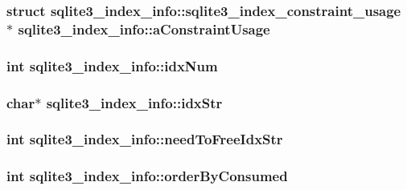 \hypertarget{structsqlite3__index__info_79b8a969dd7d582fc2ea3c0fbc5adb56}{
\subsubsection[aConstraintUsage]{\setlength{\rightskip}{0pt plus 5cm}struct {\bf sqlite3\_\-index\_\-info::sqlite3\_\-index\_\-constraint\_\-usage} $\ast$ {\bf sqlite3\_\-index\_\-info::aConstraintUsage}}}
\label{structsqlite3__index__info_79b8a969dd7d582fc2ea3c0fbc5adb56}


\hypertarget{structsqlite3__index__info_fcee17707a1c147fbd55c23c807fdae3}{
\subsubsection[idxNum]{\setlength{\rightskip}{0pt plus 5cm}int {\bf sqlite3\_\-index\_\-info::idxNum}}}
\label{structsqlite3__index__info_fcee17707a1c147fbd55c23c807fdae3}


\hypertarget{structsqlite3__index__info_1a9935e997bd6e3cce048534da7506a7}{
\subsubsection[idxStr]{\setlength{\rightskip}{0pt plus 5cm}char$\ast$ {\bf sqlite3\_\-index\_\-info::idxStr}}}
\label{structsqlite3__index__info_1a9935e997bd6e3cce048534da7506a7}


\hypertarget{structsqlite3__index__info_5410066c067c3891cdf165c70cc4d6b1}{
\subsubsection[needToFreeIdxStr]{\setlength{\rightskip}{0pt plus 5cm}int {\bf sqlite3\_\-index\_\-info::needToFreeIdxStr}}}
\label{structsqlite3__index__info_5410066c067c3891cdf165c70cc4d6b1}


\hypertarget{structsqlite3__index__info_5515d9de0f37f68d7e0930c20a668b29}{
\subsubsection[orderByConsumed]{\setlength{\rightskip}{0pt plus 5cm}int {\bf sqlite3\_\-index\_\-info::orderByConsumed}}}
\label{structsqlite3__index__info_5515d9de0f37f68d7e0930c20a668b29}


